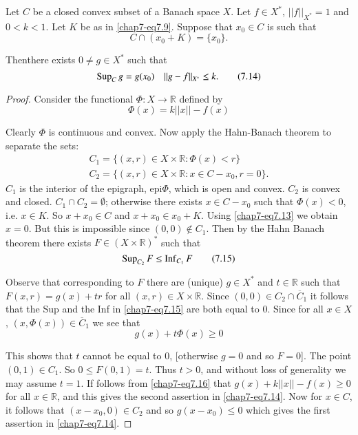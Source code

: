 \begin{lemma}\label{chap7-lem7.7}
Let $C$ be a closed convex subset of a Banach space $X$. Let $f\in
X^{*}$, $||f||_{X^{*}}=1$ and $0<k<1$. Let $K$ be as in
\eqref{chap7-eq7.9}. Suppose that $x_{0}\in C$ is such that
\begin{equation*}
C\cap (x_{0}+K)=\{x_{0}\}.\tag{7.13}\label{chap7-eq7.13} 
\end{equation*}

Then\pageoriginale there exists $0\neq g\in X^{*}$ such that
\begin{equation*}
\operatorname{Sup}_{C}g=g(x_{0})\quad  ||g-f||_{X^{*}}\leq k.\tag{7.14}\label{chap7-eq7.14}
\end{equation*}
\end{lemma}

\begin{proof}
Consider the functional $\Phi:X\to \mathbb{R}$ defined by
$$
\Phi(x)=k||x||-f(x)
$$

Clearly $\Phi$ is continuous and convex. Now apply the Hahn-Banach
theorem to separate the sets:
\begin{gather*}
C_{1}=\{(x,r)\in X\times \mathbb{R}:\Phi(x)<r\}\\
C_{2}=\{(x,r)\in X\times \mathbb{R}:x\in C-x_{0},r=0\}.
\end{gather*}
$C_{1}$ is the interior of the epigraph, epi$\Phi$, which is open and
convex. $C_{2}$ is convex and closed. $C_{1}\cap C_{2}=\emptyset$;
otherwise there exists $x\in C-x_{0}$ such that $\Phi(x)<0$, i.e.\@
$x\in K$. So $x+x_{0}\in C$ and $x+x_{0}\in x_{0}+K$. Using
\eqref{chap7-eq7.13} we obtain $x=0$. But this is impossible since
$(0,0)\not\in C_{1}$. Then by the Hahn Banach theorem there exists
$F\in (X\times \mathbb{R})^{*}$ such that
\begin{equation*}
\operatorname{Sup}_{C_{2}}F\leq \operatorname{Inf}_{C_{1}}F\tag{7.15}\label{chap7-eq7.15}
\end{equation*}

Observe that corresponding to $F$ there are (unique) $g\in X^{*}$ and
$t\in \mathbb{R}$ such that $F(x,r)=g(x)+tr$ for all $(x,r)\in X\times
\mathbb{R}$. Since $(0,0)\in C_{2}\cap \overline{C}_{1}$ it follows
that the Sup and the Inf in \eqref{chap7-eq7.15} are both equal to
$0$. Since for all $x\in X$, $(x,\Phi(x))\in \overline{C}_{1}$ we see
that
\begin{equation*}
g(x)+t\Phi(x)\geq 0\tag{7.16}\label{chap7-eq7.16}
\end{equation*}

This shows that $t$ cannot be equal to $0$, [otherwise $g=0$ and so
  $F=0$]. The point $(0,1)\in C_{1}$. So $0\leq F(0,1)=t$. Thus $t>0$,
and without loss of generality we may assume $t=1$. If follows from
\eqref{chap7-eq7.16} that $g(x)+k||x||-f(x)\geq 0$ for all $x\in
\mathbb{R}$, and this gives the second assertion in
\eqref{chap7-eq7.14}. Now for $x\in C$, it follows that
$(x-x_{0},0)\in C_{2}$ and so $g(x-x_{0})\leq 0$ which gives the first
assertion in \eqref{chap7-eq7.14}. 
\end{proof}

